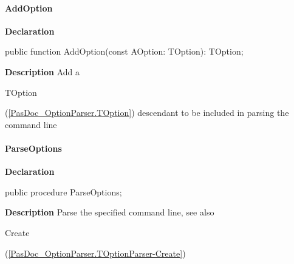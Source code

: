 \documentclass{report}
\newif\ifpdf
\begin{document}
\paragraph*{AddOption}\hspace*{\fill}

\label{PasDoc_OptionParser.TOptionParser-AddOption}
\begin{list}{}{
\setlength{\itemindent}{0cm}
\setlength{\listparindent}{0cm}
\setlength{\leftmargin}{\evensidemargin}
\addtolength{\leftmargin}{\tmplength}
\settowidth{\labelsep}{X}
\addtolength{\leftmargin}{\labelsep}
\setlength{\labelwidth}{\tmplength}
}
\item[\textbf{Declaration}\hfill]
\ifpdf
\begin{flushleft}
\fi
\begin{ttfamily}
public function AddOption(const AOption: TOption): TOption;\end{ttfamily}

\ifpdf
\end{flushleft}
\fi

\par
\item[\textbf{Description}]
Add a \begin{ttfamily}TOption\end{ttfamily}(\ref{PasDoc_OptionParser.TOption}) descendant to be included in parsing the command line

\end{list}
\paragraph*{ParseOptions}\hspace*{\fill}

\label{PasDoc_OptionParser.TOptionParser-ParseOptions}
\begin{list}{}{
\setlength{\itemindent}{0cm}
\setlength{\listparindent}{0cm}
\setlength{\leftmargin}{\evensidemargin}
\addtolength{\leftmargin}{\tmplength}
\settowidth{\labelsep}{X}
\addtolength{\leftmargin}{\labelsep}
\setlength{\labelwidth}{\tmplength}
}
\item[\textbf{Declaration}\hfill]
\ifpdf
\begin{flushleft}
\fi
\begin{ttfamily}
public procedure ParseOptions;\end{ttfamily}

\ifpdf
\end{flushleft}
\fi

\par
\item[\textbf{Description}]
Parse the specified command line, see also \begin{ttfamily}Create\end{ttfamily}(\ref{PasDoc_OptionParser.TOptionParser-Create})

\end{list}
\end{document}
